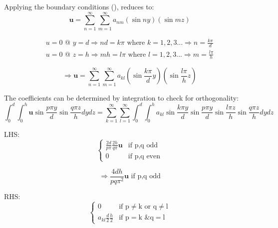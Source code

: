 Applying the boundary conditions (),  reduces to:
\begin{equation}
 \mathbf{u} = \sum_{n=1}^{\infty } \sum_{m=1}^{\infty } a_{nm} (\sin ny) (\sin mz)
\label{eqn:8}
\end{equation}


\begin{eqnarray}
 u=0 \textrm{ @ } y=d \Rightarrow nd=k\pi \textrm{ where } k=1,2,3... \Rightarrow n=\frac{k\pi}{d} \nonumber \\
 u=0 \textrm{ @ } z=h \Rightarrow mh=l\pi \textrm{ where } l=1,2,3... \Rightarrow m=\frac{l\pi}{h}
\label{eqn:9}
\end{eqnarray}



\begin{equation}
 \Rightarrow \mathbf{u} = \sum_{n=1}^{\infty } \sum_{m=1}^{\infty } a_{kl} \left (\sin \frac{k\pi}{d}y  \right ) \left(\sin \frac{l\pi}{h}z \right)
\label{eqn:11}
\end{equation}


The coefficients can be determined by integration to check for orthogonality:
\begin{equation}
 \int_{0}^{d}\int_{0}^{h} \mathbf{u} \sin \frac{p\pi y}{d} \sin \frac{q\pi z}{h} dy dz = \sum_{k=1}^{\infty } \sum_{l=1}^{\infty } \int_{0}^{d}\int_{0}^{h} a_{kl}  \sin \frac{k\pi y}{d}  \sin \frac{p\pi y}{d}  \sin \frac{l\pi z}{h}  \sin \frac{q\pi z}{h} dy dz
\label{eqn:12}
\end{equation}

LHS:
\begin{equation}
 \left\{\begin{matrix}
\frac{2d}{p \pi}\frac{2h}{q \pi}\mathbf{u} & \textrm{if p,q odd}\\ 
0 & \textrm{if p,q even} \nonumber
\end{matrix}\right.
\label{eqn:13}
\end{equation}


\begin{equation}
 \Rightarrow \frac{4dh}{pq\pi^{2}}\mathbf{u} \textrm{ if p,q odd}
\label{eqn:14}
\end{equation}

RHS:
\begin{equation}
  \left\{\begin{matrix}
0 & \textrm{if p} \neq \textrm{k or q} \neq \textrm{l}\\ 
a_{kl} \tfrac{d}{2} \tfrac{h}{2} & \textrm{if p} = \textrm{k \& q} = \textrm{l} \nonumber
\end{matrix}\right.
\label{eqn:15}
\end{equation}


